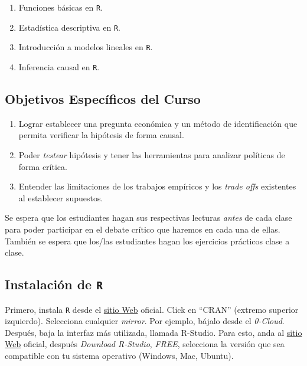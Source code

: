 \documentclass[letterpaper]{article}
\renewenvironment{itemize}{
  \begin{list}{}{
    \setlength{\leftmargin}{1.5em}
  }
}{
  \end{list}
}
\begin{document}
\begin{enumerate}
	\item Funciones b\'asicas en \texttt{R}.
	\item Estad\'istica descriptiva en \texttt{R}.
	\item Introducci\'on a modelos lineales en \texttt{R}.
  \item Inferencia causal en \texttt{R}.
\end{enumerate}
 


\subsection*{Objetivos Espec\'ificos del Curso}

\begin{enumerate}
  \item Lograr establecer una pregunta econ\'omica y un m\'etodo de identificaci\'on que permita verificar la hip\'otesis de forma causal.
  \item Poder \emph{testear} hip\'otesis y tener las herramientas para analizar pol\'iticas de forma cr\'itica.
  \item Entender las limitaciones de los trabajos emp\'iricos y los \emph{trade offs} existentes al establecer supuestos.
\end{enumerate}


\begin{itemize}
    \item[{\color{red}\Pointinghand}] Se espera que los estudiantes hagan sus respectivas lecturas \emph{antes} de cada clase para poder participar en el debate cr\'itico que haremos en cada una de ellas. Tambi\'en se espera que los/las estudiantes hagan los ejercicios pr\'acticos clase a clase.
\end{itemize}



\subsection*{Instalaci\'on de \texttt{R}}

Primero, instala \texttt{R} desde el \href{https://www.r-project.org/}{sitio Web} oficial. Click en ``CRAN'' (extremo superior izquierdo). Selecciona cualquier \emph{mirror}. Por ejemplo, b\'ajalo desde el \emph{0-Cloud}. Despu\'es, baja la interfaz m\'as utilizada, llamada R-Studio. Para esto, anda al \href{https://www.rstudio.com}{sitio Web} oficial, despu\'es \emph{Download R-Studio}, \emph{FREE}, selecciona la versi\'on que sea compatible con tu sistema operativo (Windows, Mac, Ubuntu).
\end{document}
